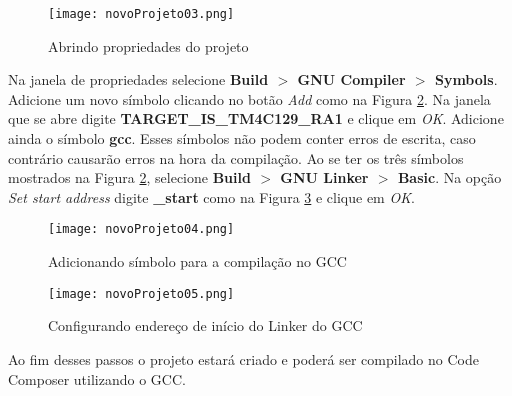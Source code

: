 \begin{figure}[H]
	\centering
	\texttt{[image: novoProjeto03.png]}
	\caption{Abrindo propriedades do projeto}
	\label{fig:novoProjeto03}
\end{figure}

Na janela de propriedades selecione \textbf{Build $>$ GNU Compiler $>$ 
Symbols}. Adicione um novo símbolo clicando no botão \emph{Add} como na Figura 
\ref{fig:novoProjeto04}. Na janela que se abre digite 
\textbf{TARGET\_IS\_TM4C129\_RA1} e clique em \emph{OK}. Adicione ainda o 
símbolo \textbf{gcc}. Esses símbolos não podem conter erros de escrita, caso 
contrário causarão erros na hora da compilação. Ao se ter os três símbolos 
mostrados na Figura \ref{fig:novoProjeto04}, selecione \textbf{Build $>$ GNU 
Linker $>$ Basic}. Na opção \emph{Set start address} digite \textbf{\_start} 
como na Figura \ref{fig:novoProjeto05} e clique em \emph{OK}.

\begin{figure}[H]
	\centering
	\texttt{[image: novoProjeto04.png]}
	\caption{Adicionando símbolo para a compilação no GCC}
	\label{fig:novoProjeto04}
\end{figure}

\begin{figure}[H]
	\centering
	\texttt{[image: novoProjeto05.png]}
	\caption{Configurando endereço de início do Linker do GCC}
	\label{fig:novoProjeto05}
\end{figure}

Ao fim desses passos o projeto estará criado e poderá ser compilado no Code Composer utilizando o GCC.